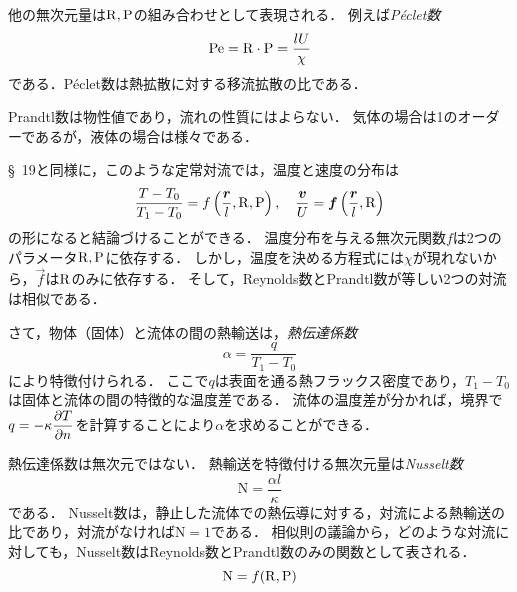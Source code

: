 他の無次元量は$\mathrm{R}, \mathrm{P}$の組み合わせとして表現される．
例えば\emph{P\'{e}clet数}
\[
    \mathrm{Pe} = \mathrm{R} \cdot \mathrm{P} = \frac{lU}{\chi}
\]
である．P\'{e}clet数は熱拡散に対する移流拡散の比である．


Prandtl数は物性値であり，流れの性質にはよらない．
気体の場合は1のオーダーであるが，液体の場合は様々である．






\S~19と同様に，このような定常対流では，温度と速度の分布は
\begin{equation}
    \frac{T-T_0}{T_1-T_0} = f \left( \frac{\vb*{r}}{l}, \mathrm{R}, \mathrm{P} \right), \quad
    \frac{\vb*{v}}{U} = \vb*{f} \left( \frac{\vb*{r}}{l}, \mathrm{R} \right)
\end{equation}
の形になると結論づけることができる．
温度分布を与える無次元関数$f$は2つのパラメータ$\mathrm{R}, \mathrm{P}$に依存する．
しかし，温度を決める方程式には$\chi$が現れないから，$\vec{f}$は$\mathrm{R}$のみに依存する．
そして，Reynolds数とPrandtl数が等しい2つの対流は相似である．



さて，物体（固体）と流体の間の熱輸送は，\emph{熱伝達係数}
\begin{equation}
    \alpha = \frac{q}{T_1-T_0}
\end{equation}
により特徴付けられる．
ここで$q$は表面を通る熱フラックス密度であり，$T_1-T_0$は固体と流体の間の特徴的な温度差である．
流体の温度差が分かれば，境界で$q = -\kappa \dpdv{T}{n}$を計算することにより$\alpha$を求めることができる．


熱伝達係数は無次元ではない．
熱輸送を特徴付ける無次元量は\emph{Nusselt数}
\begin{equation}
    \mathrm{N} = \frac{\alpha l}{\kappa}
\end{equation}
である．
Nusselt数は，静止した流体での熱伝導に対する，対流による熱輸送の比であり，対流がなければ$\mathrm{N}=1$である．
相似則の議論から，どのような対流に対しても，Nusselt数はReynolds数とPrandtl数のみの関数として表される．
\begin{equation}
    \mathrm{N} = f(\mathrm{R}, \mathrm{P})
\end{equation}


